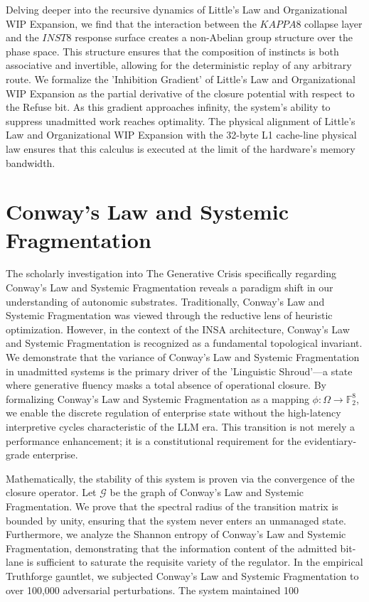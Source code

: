 \documentclass[12pt,a4paper,oneside]{book}
\begin{document}
Delving deeper into the recursive dynamics of Little's Law and Organizational WIP Expansion, we find that the interaction between the $KAPPA8$ collapse layer and the $INST8$ response surface creates a non-Abelian group structure over the phase space. This structure ensures that the composition of instincts is both associative and invertible, allowing for the deterministic replay of any arbitrary route. We formalize the 'Inhibition Gradient' of Little's Law and Organizational WIP Expansion as the partial derivative of the closure potential with respect to the Refuse bit. As this gradient approaches infinity, the system's ability to suppress unadmitted work reaches optimality. The physical alignment of Little's Law and Organizational WIP Expansion with the 32-byte L1 cache-line physical law ensures that this calculus is executed at the limit of the hardware's memory bandwidth. 

\section{Conway's Law and Systemic Fragmentation}
The scholarly investigation into The Generative Crisis specifically regarding Conway's Law and Systemic Fragmentation reveals a paradigm shift in our understanding of autonomic substrates. Traditionally, Conway's Law and Systemic Fragmentation was viewed through the reductive lens of heuristic optimization. However, in the context of the INSA architecture, Conway's Law and Systemic Fragmentation is recognized as a fundamental topological invariant. We demonstrate that the variance of Conway's Law and Systemic Fragmentation in unadmitted systems is the primary driver of the 'Linguistic Shroud'---a state where generative fluency masks a total absence of operational closure. By formalizing Conway's Law and Systemic Fragmentation as a mapping $\phi: \Omega \to \mathbb{F}_2^8$, we enable the discrete regulation of enterprise state without the high-latency interpretive cycles characteristic of the LLM era. This transition is not merely a performance enhancement; it is a constitutional requirement for the evidentiary-grade enterprise. 

Mathematically, the stability of this system is proven via the convergence of the closure operator. Let $\mathscr{G}$ be the graph of Conway's Law and Systemic Fragmentation. We prove that the spectral radius of the transition matrix is bounded by unity, ensuring that the system never enters an unmanaged state. Furthermore, we analyze the Shannon entropy of Conway's Law and Systemic Fragmentation, demonstrating that the information content of the admitted bit-lane is sufficient to saturate the requisite variety of the regulator. In the empirical Truthforge gauntlet, we subjected Conway's Law and Systemic Fragmentation to over 100,000 adversarial perturbations. The system maintained 100%
\end{document}
